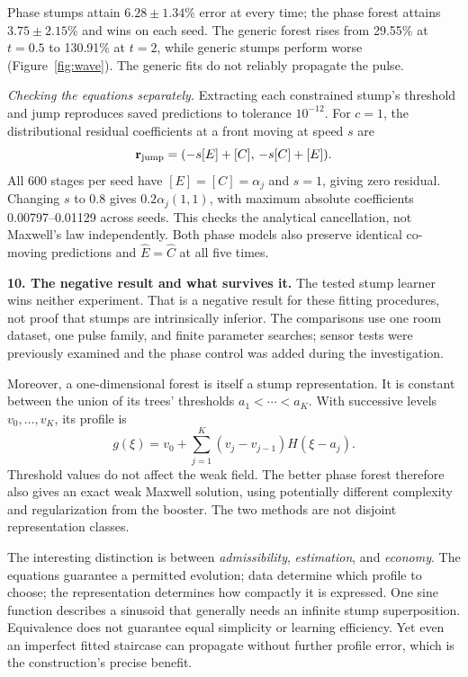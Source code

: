 \documentclass[11pt,letterpaper]{article}
\begin{document}
Phase stumps attain $6.28\pm1.34$\% error at every time; the phase forest attains
$3.75\pm2.15$\% and wins on each seed. The generic forest rises from 29.55\%
at $t=0.5$ to 130.91\% at $t=2$, while generic stumps perform worse
(Figure~\ref{fig:wave}). The generic fits do not reliably propagate the pulse.

\emph{Checking the equations separately.}
Extracting each constrained stump's threshold and jump reproduces saved
predictions to tolerance $10^{-12}$. For $c=1$, the distributional residual
coefficients at a front moving at speed $s$ are
\begin{equation}
 \mathbf r_{\rm jump}=(-s[E]+[C],\,-s[C]+[E]).
\end{equation}
All 600 stages per seed have $[E]=[C]=\alpha_j$ and $s=1$, giving zero residual.
Changing $s$ to 0.8 gives $0.2\alpha_j(1,1)$, with maximum absolute coefficients
0.00797--0.01129 across seeds. This checks the analytical cancellation, not
Maxwell's law independently. Both phase models also preserve identical
co-moving predictions and $\widehat E=\widehat C$ at all five times.

\textbf{10. The negative result and what survives it.}
The tested stump learner wins neither experiment. That is a negative result
for these fitting procedures, not proof that stumps are intrinsically inferior.
The comparisons use one room dataset, one pulse family, and finite parameter
searches; sensor tests were previously examined and the phase control was added
during the investigation.

Moreover, a one-dimensional forest is itself a stump representation. It is
constant between the union of its trees' thresholds $a_1<\cdots<a_K$.
With successive levels $v_0,\ldots,v_K$, its profile is
\begin{equation}
 g(\xi)=v_0+\sum_{j=1}^K(v_j-v_{j-1})H(\xi-a_j).
 \label{eq:forest-as-stumps}
\end{equation}
Threshold values do not affect the weak field. The better phase forest therefore
also gives an exact weak Maxwell solution, using potentially different complexity
and regularization from the booster. The two methods are not disjoint
representation classes.

The interesting distinction is between \emph{admissibility}, \emph{estimation},
and \emph{economy}. The equations guarantee a permitted evolution; data determine
which profile to choose; the representation determines how compactly it is
expressed. One sine function describes a sinusoid that generally needs an infinite
stump superposition. Equivalence does not guarantee equal simplicity or learning
efficiency. Yet even an imperfect fitted staircase can propagate without further
profile error, which is the construction's precise benefit.
\end{document}
